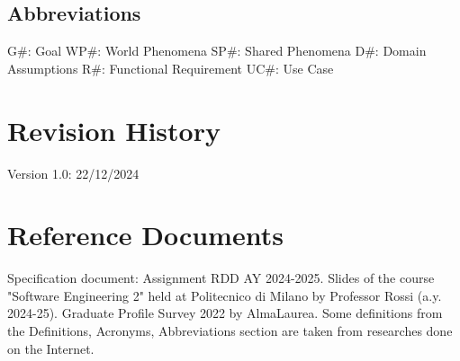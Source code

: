 \subsection{Abbreviations}
G\#: Goal\newline
WP\#: World Phenomena\newline
SP\#: Shared Phenomena\newline
D\#: Domain Assumptions\newline
R\#: Functional Requirement\newline
UC\#: Use Case

\section{Revision History}
Version 1.0: 22/12/2024

\section{Reference Documents}
Specification document: Assignment RDD AY 2024-2025. \newline
Slides of the course "Software Engineering 2" held at Politecnico di Milano by Professor Rossi (a.y. 2024-25).\newline
Graduate Profile Survey 2022 by AlmaLaurea.\newline
Some definitions from the Definitions, Acronyms, Abbreviations section are taken from researches done on the Internet.\newline

